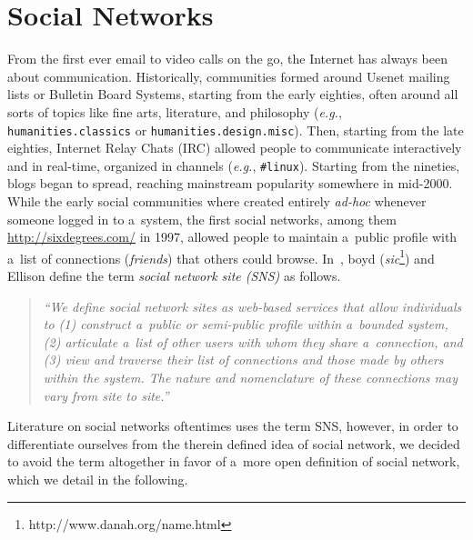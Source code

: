 \chapter{Social Networks}
\label{cha:social-networks}

\ifpdf
    \graphicspath{{3_social_networks/figures/PNG/}{3_social_networks/figures/PDF/}{3_social_networks/figures/}}
\else
    \graphicspath{{3_social_networks/figures/EPS/}{3_social_networks/figures/}}
\fi

From the first ever email to video calls on the go,
the Internet has always been about communication.
Historically, communities formed around Usenet mailing lists or Bulletin Board Systems, starting from the early eighties,
often around all sorts of topics like fine arts,
literature, and philosophy (\emph{e.g.}, \texttt{humanities.classics}
or \texttt{humanities.\-design.misc}).
Then, starting from the late eighties, Internet Relay Chats (IRC)
allowed people to communicate interactively and in real-time,
organized in channels (\emph{e.g.}, \texttt{\#linux}).
Starting from the nineties, blogs began to spread,
reaching mainstream popularity somewhere in mid-2000.
While the early social communities
where created entirely \emph{ad-hoc}
whenever someone logged in to a~system,
the first social networks,
among them \url{http://sixdegrees.com/} in 1997,
allowed people to maintain a~public profile
with a~list of connections (\emph{friends})
that others could browse.
In~\cite{boyd2007socialnetworksites}, boyd
(\emph{sic}\footnote{http://www.danah.org/name.html})
and Ellison define the term
\emph{social network site (SNS)} as follows.

\begin{quotation}
  \textit{``We define social network sites as web-based services
  that allow individuals to
  (1) construct a~public or
  semi-public profile within a~bounded system,
  (2) articulate a~list of other users
  with whom they share a~connection, and
  (3) view and traverse their list of connections
  and those made by others within the system.
  The nature and nomenclature of these connections
  may vary from site to site.''}
\end{quotation}

Literature on social networks oftentimes uses the term SNS,
however, in order to differentiate ourselves
from the therein defined idea of social network,
we decided to avoid the term altogether in favor of a~more open
definition of social network,
which we detail in the following. 

